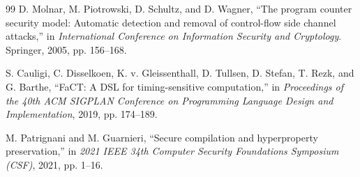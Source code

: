 \documentclass[11pt,a4paper]{article}
\theoremstyle{definition}
\begin{document}
\begin{thebibliography}{99}
D. Molnar, M. Piotrowski, D. Schultz, and D. Wagner, ``The program counter security model: Automatic detection and removal of control-flow side channel attacks,'' in \textit{International Conference on Information Security and Cryptology}. Springer, 2005, pp. 156--168.

S. Cauligi, C. Disselkoen, K. v. Gleissenthall, D. Tullsen, D. Stefan, T. Rezk, and G. Barthe, ``FaCT: A DSL for timing-sensitive computation,'' in \textit{Proceedings of the 40th ACM SIGPLAN Conference on Programming Language Design and Implementation}, 2019, pp. 174--189.

M. Patrignani and M. Guarnieri, ``Secure compilation and hyperproperty preservation,'' in \textit{2021 IEEE 34th Computer Security Foundations Symposium (CSF)}, 2021, pp. 1--16.

\end{thebibliography}
\end{document}
